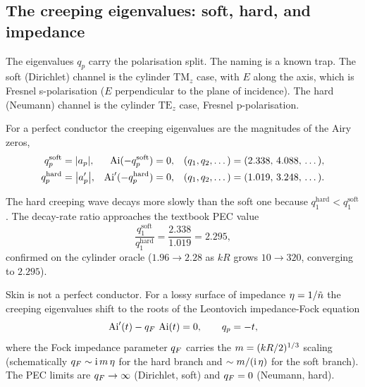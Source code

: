 \subsection{The creeping eigenvalues: soft, hard, and impedance}\label{sec:fock-eig}

The eigenvalues $q_p$ carry the polarisation split. The naming is a known trap.
The soft (Dirichlet) channel is the cylinder $\mathrm{TM}_z$ case, with $E$ along
the axis, which is Fresnel s-polarisation ($E$ perpendicular to the plane of
incidence). The hard (Neumann) channel is the cylinder $\mathrm{TE}_z$ case,
Fresnel p-polarisation.

\begin{definition}\label{def:pec-eig}
For a perfect conductor the creeping eigenvalues are the magnitudes of the Airy
zeros,
\begin{align}
  q_p^{\text{soft}} &= \abs{a_p}, & \operatorname{Ai}(-q_p^{\text{soft}}) &= 0,
    & (q_1,q_2,\dots) &= (2.338,\,4.088,\,\dots), \label{eq:q-soft}\\
  q_p^{\text{hard}} &= \abs{a_p'}, & \operatorname{Ai}'(-q_p^{\text{hard}}) &= 0,
    & (q_1,q_2,\dots) &= (1.019,\,3.248,\,\dots). \label{eq:q-hard}
\end{align}
\end{definition}

The hard creeping wave decays more slowly than the soft one because
$q_1^{\text{hard}}<q_1^{\text{soft}}$. The decay-rate ratio approaches the
textbook PEC value
\begin{equation}\label{eq:ratio-pec}
  \frac{q_1^{\text{soft}}}{q_1^{\text{hard}}} = \frac{2.338}{1.019} = 2.295,
\end{equation}
confirmed on the cylinder oracle ($1.96\to 2.28$ as $kR$ grows $10\to 320$,
converging to $2.295$).

Skin is not a perfect conductor. For a lossy surface of impedance
$\eta=1/\tilde{n}$ the creeping eigenvalues shift to the roots of the Leontovich
impedance-Fock equation
\begin{equation}\label{eq:leontovich}
  \operatorname{Ai}'(t) - q_{F}\,\operatorname{Ai}(t) = 0, \qquad q_p = -t,
\end{equation}
where the Fock impedance parameter $q_{F}$ carries the $m=(kR/2)^{1/3}$
scaling (schematically $q_{F}\sim\mathrm{i}\,m\,\eta$ for the hard branch and
$\sim m/(\mathrm{i}\,\eta)$ for the soft branch). The PEC limits are
$q_{F}\to\infty$ (Dirichlet, soft) and $q_{F}=0$ (Neumann, hard).

